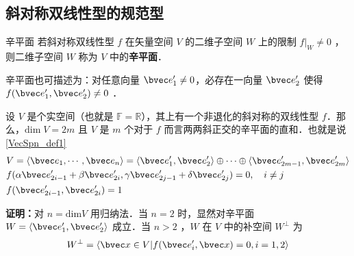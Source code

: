  \subsection{斜对称双线性型的规范型}
 \begin{definition}{辛平面}
 若斜对称双线性型 $f$ 在矢量空间 $V$ 的二维子空间 $W$ 上的限制 $f|_W\neq0$ ，则二维子空间 $W$ 称为 $V$ 中的\textbf{辛平面}．
 \end{definition}
 辛平面也可描述为：对任意向量 $\bvec e'_1\neq0$，必存在一向量 $\bvec e'_2$ 使得 $f(\bvec e'_1,\bvec e'_2)\neq0$ ．
 \begin{theorem}{}
 设 $V$ 是个实空间（也就是 $\mathbb{F}=\mathbb{R}$），其上有一个非退化的斜对称的双线性型 $f$．那么，$\mathrm{dim}\;V=2m$ 且 $V$ 是 $m$ 个对于 $f$ 而言两两斜正交的辛平面的直和．也就是说\autoref{VecSpn_def1}~
 \begin{equation}
 \begin{aligned}
 &V=\langle\bvec e_1,\cdots,\bvec e_n\rangle=\langle\bvec e'_1,\bvec e'_2\rangle\oplus\cdots\oplus\langle\bvec e'_{2m-1},\bvec e'_{2m}\rangle\\
&f(\alpha\bvec e'_{2i-1}+\beta\bvec e'_{2i},\gamma\bvec e'_{2j-1}+\delta\bvec e'_{2j})=0,\quad i\neq j\\
 &f(\bvec e'_{2i-1},\bvec e'_{2i})=1
 \end{aligned}
 \end{equation}

 \end{theorem}
\textbf{证明：}对 $n=\mathrm{dim} V$ 用归纳法．当 $n=2$ 时，显然对辛平面 $W=\langle \bvec e'_1,\bvec e'_2\rangle$ 成立．当 $n>2$ ，$W$ 在 $V$ 中的补空间 $W^{\perp}$ 为
\begin{equation}
W^{\perp}=\langle\bvec x\in V|f(\bvec e'_i,\bvec x)=0,i=1,2\rangle
\end{equation}
